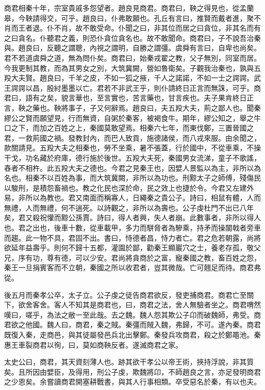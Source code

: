 商君相秦十年，宗室貴戚多怨望者。趙良見商君。商君曰，鞅之得見也，從孟蘭皋，今鞅請得交，可乎。趙良曰，仆弗敢願也。孔丘有言曰，推賢而戴者進，聚不肖而王者退。仆不肖，故不敢受命。仆聞之曰，非其位而居之曰貪位，非其名而有之曰貪名。仆聽君之義，則恐仆貪位貪名也。故不敢聞命。商君曰，子不說吾治秦與。趙良曰，反聽之謂聰，內視之謂明，自勝之謂彊。虞舜有言曰，自卑也尚矣。君不若道虞舜之道，無為問仆矣。商君曰，始秦戎翟之教，父子無別，同室而居。今我更制其教，而為其男女之別，大筑冀闕，營如魯衛矣。子觀我治秦也，孰與五羖大夫賢。趙良曰，千羊之皮，不如一狐之掖，千人之諾諾，不如一士之諤諤。武王諤諤以昌，殷紂墨墨以亡。君若不非武王乎，則仆請終日正言而無誅，可乎。商君曰，語有之矣，貌言華也，至言實也，苦言藥也，甘言疾也。夫子果肯終日正言，鞅之藥也。鞅將事子，子又何辭焉。趙良曰，夫五羖大夫，荊之鄙人也。聞秦繆公之賢而願望見，行而無資，自粥於秦客，被褐食牛。期年，繆公知之，舉之牛口之下，而加之百姓之上，秦國莫敢望焉。相秦六七年，而東伐鄭，三置晉國之君，一救荊國之禍。發教封內，而巴人致貢，施德諸侯，而八戎來服。由余聞之，款關請見。五羖大夫之相秦也，勞不坐乘，暑不張蓋，行於國中，不從車乘，不操干戈，功名藏於府庫，德行施於後世。五羖大夫死，秦國男女流涕，童子不歌謠，舂者不相杵。此五羖大夫之德也。今君之見秦王也，因嬖人景監以為主，非所以為名也。相秦不以百姓為事，而大筑冀闕，非所以為功也。刑黥太子之師傅，殘傷民以駿刑，是積怨畜禍也。教之化民也深於命，民之效上也捷於令。今君又左建外易，非所以為教也。君又南面而稱寡人，日繩秦之貴公子。詩曰，相鼠有體，人而無禮，人而無禮，何不遄死。以詩觀之，非所以為壽也。公子虔杜門不出已八年矣，君又殺祝懽而黥公孫賈。詩曰，得人者興，失人者崩。此數事者，非所以得人也。君之出也，後車十數，從車載甲，多力而駢脅者為驂乘，持矛而操闟戟者旁車而趨。此一物不具，君固不出。書曰，恃德者昌，恃力者亡。君之危若朝露，尚將欲延年益壽乎。則何不歸十五都，灌園於鄙，勸秦王顯巖穴之士，養老存孤，敬父兄，序有功，尊有德，可以少安。君尚將貪商於之富，寵秦國之教，畜百姓之怨，秦王一旦捐賓客而不立朝，秦國之所以收君者，豈其微哉。亡可翹足而待。商君弗從。

後五月而秦孝公卒，太子立。公子虔之徒告商君欲反，發吏捕商君。商君亡至關下，欲舍客舍。客人不知其是商君也，曰，商君之法，舍人無驗者坐之。商君喟然嘆曰，嗟乎，為法之敝一至此哉。去之魏。魏人怨其欺公子卬而破魏師，弗受。商君欲之他國。魏人曰，商君，秦之賊。秦彊而賊入魏，弗歸，不可。遂內秦。商君既復入秦，走商邑，與其徒屬發邑兵北出擊鄭。秦發兵攻商君，殺之於鄭黽池。秦惠王車裂商君以徇，曰，莫如商鞅反者。遂滅商君之家。

太史公曰，商君，其天資刻薄人也。跡其欲干孝公以帝王術，挾持浮說，非其質矣。且所因由嬖臣，及得用，刑公子虔，欺魏將卬，不師趙良之言，亦足發明商君之少恩矣。余嘗讀商君開塞耕戰書，與其人行事相類。卒受惡名於秦，有以也夫。
